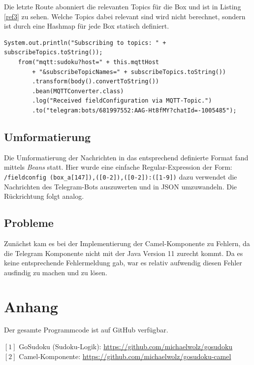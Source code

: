 \documentclass[11pt,parskip=full]{scrartcl}
\begin{document}
Die letzte Route abonniert die relevanten Topics für die Box und ist in Listing \ref{ref3} zu sehen. Welche Topics dabei relevant sind wird nicht berechnet, sondern ist durch eine Hashmap für jede Box statisch definiert.

\begin{lstlisting}[caption = Nachrichten von MQTT zu Telegram, label=ref3]
System.out.println("Subscribing to topics: " + subscribeTopics.toString());
    from("mqtt:sudoku?host=" + this.mqttHost
        + "&subscribeTopicNames=" + subscribeTopics.toString())
        .transform(body().convertToString())
        .bean(MQTTConverter.class)
        .log("Received fieldConfiguration via MQTT-Topic.")
        .to("telegram:bots/681997552:AAG-Ht8fMY?chatId=-1005485");
\end{lstlisting}

\subsection{Umformatierung}

Die Umformatierung der Nachrichten in das entsprechend definierte Format fand mittels \textit{Beans} statt. Hier wurde eine einfache Regular-Expression der Form: \texttt{/fieldconfig (box\_a[147]),([0-2]),([0-2]):([1-9])} dazu verwendet die Nachrichten des Telegram-Bots auszuwerten und in JSON umzuwandeln. Die Rückrichtung folgt analog. 

\subsection{Probleme}

Zunächst kam es bei der Implementierung der Camel-Komponente zu Fehlern, da die Telegram Komponente nicht mit der Java Version 11 zurecht kommt. Da es keine entsprechende Fehlermeldung gab, war es relativ aufwendig diesen Fehler ausfindig zu machen und zu lösen. 


\section{Anhang}

Der gesamte Programmcode ist auf GitHub verfügbar.

$[1]$ GoSudoku (Sudoku-Logik): \url{https://github.com/michaelwolz/gosudoku}\\
$[2]$ Camel-Komponente: \url{https://github.com/michaelwolz/gosudoku-camel}
\end{document}
